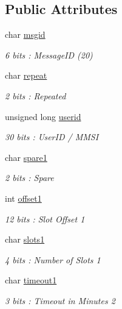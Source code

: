 \subsection*{Public Attributes}
\begin{DoxyCompactItemize}
\item 
char \mbox{\hyperlink{structaismsg__20_a5220e0e88811e11a8fa71586d88d8b0d}{msgid}}
\begin{DoxyCompactList}\small\item\em 6 bits \+: Message\+ID (20) \end{DoxyCompactList}\item 
char \mbox{\hyperlink{structaismsg__20_a4fbab292ae841079bd1d72228c213f9d}{repeat}}
\begin{DoxyCompactList}\small\item\em 2 bits \+: Repeated \end{DoxyCompactList}\item 
unsigned long \mbox{\hyperlink{structaismsg__20_a8e37854d7dcf380ed6735a19190c2809}{userid}}
\begin{DoxyCompactList}\small\item\em 30 bits \+: User\+ID / M\+M\+SI \end{DoxyCompactList}\item 
char \mbox{\hyperlink{structaismsg__20_a1f3921ab0128b40e0512ac5a891081cb}{spare1}}
\begin{DoxyCompactList}\small\item\em 2 bits \+: Spare \end{DoxyCompactList}\item 
int \mbox{\hyperlink{structaismsg__20_a4afd862f9ce1b68acaa4acba2ab13058}{offset1}}
\begin{DoxyCompactList}\small\item\em 12 bits \+: Slot Offset 1 \end{DoxyCompactList}\item 
char \mbox{\hyperlink{structaismsg__20_a394876b5ea47e0069059f7ceb808701e}{slots1}}
\begin{DoxyCompactList}\small\item\em 4 bits \+: Number of Slots 1 \end{DoxyCompactList}\item 
char \mbox{\hyperlink{structaismsg__20_ae1ab4d78654bf87c150e761188193b35}{timeout1}}
\begin{DoxyCompactList}\small\item\em 3 bits \+: Timeout in Minutes 2 \end{DoxyCompactList}\item 

\end{DoxyCompactItemize}
